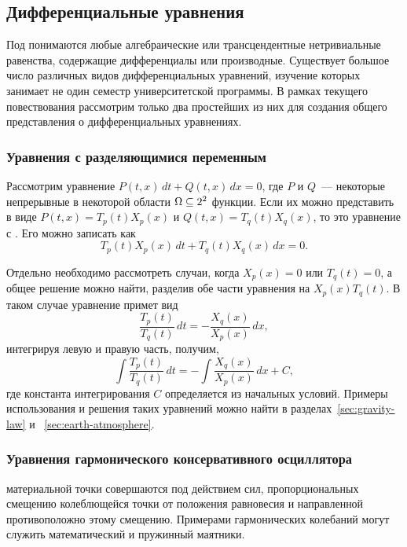 \subsection{Дифференциальные уравнения}
Под  понимаются любые алгебраические или трансцендентные нетривиальные равенства, содержащие дифференциалы или производные. Существует большое число различных видов дифференциальных уравнений, изучение которых занимает не один семестр университетской программы. В рамках текущего повествования рассмотрим только два простейших из них для создания общего представления о дифференциальных уравнениях.

\subsubsection{Уравнения с разделяющимися переменным}

Рассмотрим уравнение $ P(t,x)\,dt + Q(t,x)\,dx = 0$, где $P$ и $Q$~--- некоторые непрерывные в некоторой области $\Omega \subseteq 2^2$ функции. Если их можно представить в виде $P(t,x) = T_p(t)X_p(x)$ и $Q(t,x) = T_q(t)X_q(x)$, то это уравнение с . Его можно записать как
\begin{equation*}
    T_p(t)X_p(x)\,dt + T_q(t)X_q(x)\,dx = 0.
\end{equation*}

Отдельно необходимо рассмотреть случаи, когда $X_p(x) = 0$ или $T_q(t) = 0$, а общее решение можно найти, разделив обе части уравнения на $X_p(x)T_q(t)$. В таком случае уравнение примет вид
\begin{equation*}
    \frac{T_p(t)}{T_q(t)} \, dt = - \frac{X_q(x)}{X_p(x)} \, dx,
\end{equation*}
интегрируя левую и правую часть, получим,
\begin{equation*}
     \int \frac{T_p(t)}{T_q(t)} \, dt = - \int \frac{X_q(x)}{X_p(x)} \, dx + C,
\end{equation*}
где константа интегрирования $C$ определяется из начальных условий. Примеры использования и решения таких уравнений можно найти в разделах~\ref{sec:gravity-law} и ~\ref{sec:earth-atmosphere}.

\subsubsection{Уравнения гармонического консервативного осциллятора}

 материальной точки совершаются под действием сил, пропорциональных смещению колеблющейся точки от положения равновесия и направленной противоположно этому смещению. Примерами гармонических колебаний могут служить математический и пружинный маятники.

